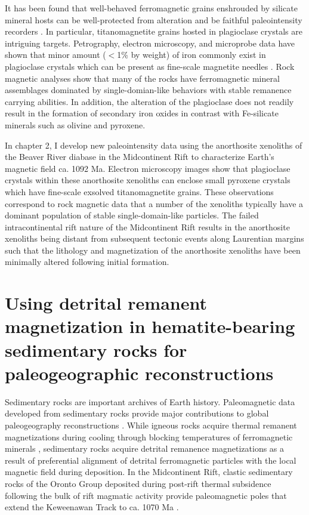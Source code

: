 It has been found that well-behaved ferromagnetic grains enshrouded by silicate mineral hosts can be well-protected from alteration and be faithful paleointensity recorders \citep{Cottrell1999a, Cottrell2000a, Tarduno2005a, Tarduno2006a, Cottrell2008a, Selkin2000a, Selkin2007a, Selkin2008a}. In particular, titanomagnetite grains hosted in plagioclase crystals are intriguing targets. Petrography, electron microscopy, and microprobe data have shown that minor amount ($<$1\% by weight) of iron commonly exist in plagioclase crystals which can be present as fine-scale magnetite needles \citep{Selkin2000a, Feinberg2005a, Feinberg2006a, Wenk2011a, Bian2021a}. Rock magnetic analyses show that many of the rocks have ferromagnetic mineral assemblages dominated by single-domian-like behaviors with stable remanence carrying abilities. In addition, the alteration of the plagioclase does not readily result in the formation of secondary iron oxides in contrast with Fe-silicate minerals such as olivine and pyroxene. 

In chapter 2, I develop new paleointensity data using the anorthosite xenoliths of the Beaver River diabase in the Midcontinent Rift to characterize Earth's magnetic field ca. 1092 Ma. Electron microscopy images show that plagioclase crystals within these anorthosite xenoliths can enclose small pyroxene crystals which have fine-scale exsolved titanomagnetite grains. These observations correspond to rock magnetic data that a number of the xenoliths typically have a dominant population of stable single-domain-like particles. The failed intracontinental rift nature of the Midcontinent Rift results in the anorthosite xenoliths being distant from subsequent tectonic events along Laurentian margins such that the lithology and magnetization of the anorthosite xenoliths have been minimally altered following initial formation. 

\section{Using detrital remanent magnetization in hematite-bearing sedimentary rocks for paleogeographic reconstructions}

Sedimentary rocks are important archives of Earth history. Paleomagnetic data developed from sedimentary rocks provide major contributions to global paleogeography reconstructions \cite[e.g.][]{Torsvik2012a, Domeier2012a, Vaes2023a}. While igneous rocks acquire thermal remanent magnetizations during cooling through blocking temperatures of ferromagnetic minerals \citep{Neel1955a}, sedimentary rocks acquire detrital remanence magnetizations as a result of preferential alignment of detrital ferromagnetic particles with the local magnetic field during deposition. In the Midcontinent Rift, clastic sedimentary rocks of the Oronto Group deposited during post-rift thermal subsidence following the bulk of rift magmatic activity provide paleomagnetic poles that extend the Keweenawan Track to ca. 1070 Ma \citep{Henry1977a, Slotznick2023a}. 

